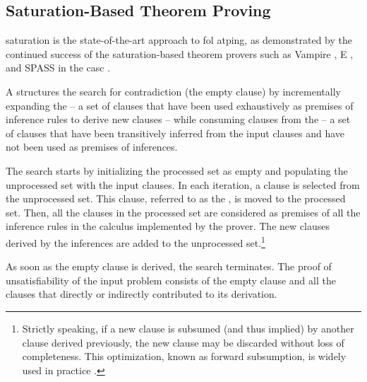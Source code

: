 \subsection{Saturation-Based Theorem Proving}

\Gls{saturation} is the state-of-the-art approach to \gls{fol} \gls{atping},
as demonstrated by the continued success of the saturation-based theorem provers such as Vampire \cite{DBLP:conf/cav/KovacsV13}, E \cite{DBLP:conf/cade/0001CV19}, and SPASS \cite{DBLP:conf/cade/WeidenbachDFKSW09} in the \gls{casc} \cite{Sut16}.

A  structures the search for contradiction
(the empty clause)
by incrementally expanding the 
-- a set of clauses that have been used exhaustively as premises of inference rules to derive new clauses -- while consuming clauses from the  -- a set of clauses that have been transitively inferred from the input clauses and have not been used as premises of inferences.

The search starts by initializing the processed set as empty and populating the unprocessed set with the input clauses.
In each iteration,
a clause is selected from the unprocessed set.
This clause, referred to as the , is moved to the processed set.
Then, all the clauses in the processed set are considered as premises of all the inference rules in the calculus implemented by the prover.
The new clauses derived by the inferences are added to the unprocessed set.\footnote{Strictly speaking, if a new clause is subsumed (and thus implied) by another clause derived previously, the new clause may be discarded without loss of completeness. This optimization, known as forward subsumption, is widely used in practice \cite{DBLP:journals/corr/cs-SC-0310056,DBLP:journals/jar/Voronkov95,DBLP:books/daglib/0022394}.}

As soon as the empty clause is derived, the search terminates.
The proof of unsatisfiability of the input problem consists of the empty clause and all the clauses that directly or indirectly contributed to its derivation.

